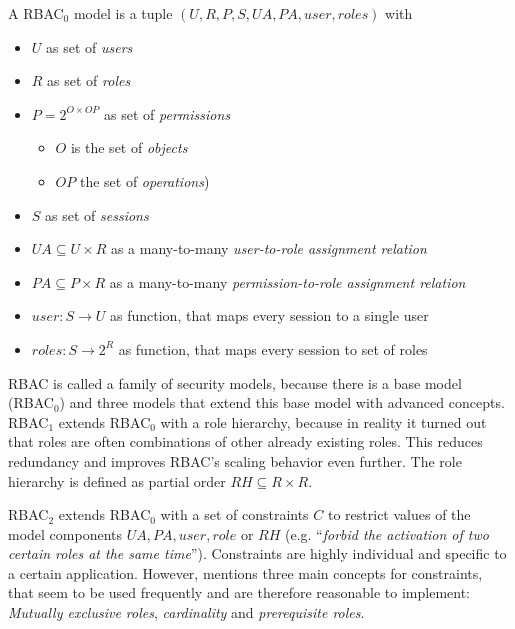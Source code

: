 \documentclass[twoside, openright, 12pt]{book}
\begin{document}
\begin{xdefinition}[RBAC] 
A RBAC$_0$ model is a tuple $(U, R, P, S, UA, PA, user, roles)$ with

\vspace{-2mm}
\begin{itemize}
\setlength\itemsep{0em}
\item $U$ as set of \textit{users}
\item $R$ as set of \textit{roles}
\item $P = 2^{O \times OP}$ as set of \textit{permissions}
\vspace{-2mm}
\begin{itemize}
\item $O$ is the set of \textit{objects}
\item $OP$ the set of \textit{operations})
\end{itemize}
\vspace{-2mm}
\item $S$ as set of \textit{sessions}
\item $UA \subseteq U \times R$ as a many-to-many \textit{user-to-role assignment relation}
\item $PA \subseteq P \times R$ as a many-to-many \textit{permission-to-role assignment relation}
\item $user: S \rightarrow U$ as function, that maps every session to a single user
\item $roles: S \rightarrow 2^R$ as function, that maps every session to set of roles
\end{itemize}
\label{definition:RBAC}
\end{xdefinition}

\noindent
RBAC is called a family of security models, because there is a base model (RBAC$_0$) and three models that extend this base model with advanced concepts.
RBAC$_1$ extends RBAC$_0$ with a role hierarchy, because in reality it turned out that roles are often combinations of other already existing roles.
This reduces redundancy and improves RBAC's scaling behavior even further.
The role hierarchy is defined as partial order $RH \subseteq R \times R$.%

RBAC$_2$ extends RBAC$_0$ with a set of constraints $C$ to restrict values of the model components $UA, PA, user, role$ or $RH$ (e.g. ``\textit{forbid the activation of two certain roles at the same time}'').
Constraints are highly individual and specific to a certain application.
However, \cite{Sandhu96} mentions three main concepts for constraints, that seem to be used frequently and are therefore reasonable to implement: \textit{Mutually exclusive roles}, \textit{cardinality} and \textit{prerequisite roles}.
\end{document}
